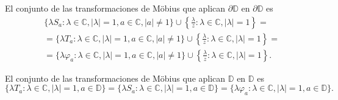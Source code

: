 \begin{proposition}
    El conjunto de las transformaciones de Möbius que aplican $\partial\mathbb{D}$ en $\partial\mathbb{D}$ es
    \begin{align*}
         & \{\lambda S_a : \lambda \in \mathbb{C}, |\lambda| = 1, a \in \mathbb{C}, |a| \neq 1\} \cup \left\{\frac{\lambda}{z} : \lambda \in \mathbb{C}, |\lambda| = 1\right\} =       \\
         & = \{\lambda T_a : \lambda \in \mathbb{C}, |\lambda| = 1, a \in \mathbb{C}, |a| \neq 1\} \cup \left\{\frac{\lambda}{z} : \lambda \in \mathbb{C}, |\lambda| = 1\right\} =     \\
         & = \{\lambda\varphi_a : \lambda \in \mathbb{C}, |\lambda| = 1, a \in \mathbb{C}, |a| \neq 1\} \cup \left\{\frac{\lambda}{z} : \lambda \in \mathbb{C}, |\lambda| = 1\right\}.
    \end{align*}
\end{proposition}

\begin{proposition}
    El conjunto de las transformaciones de Möbius que aplican $\mathbb{D}$ en $\mathbb{D}$ es
    $$\{\lambda T_a : \lambda \in \mathbb{C}, |\lambda| = 1, a \in \mathbb{D}\} = \{\lambda S_a : \lambda \in \mathbb{C}, |\lambda| = 1, a \in \mathbb{D}\} = \{\lambda \varphi_a : \lambda \in \mathbb{C}, |\lambda| = 1, a \in \mathbb{D}\}.$$
\end{proposition}